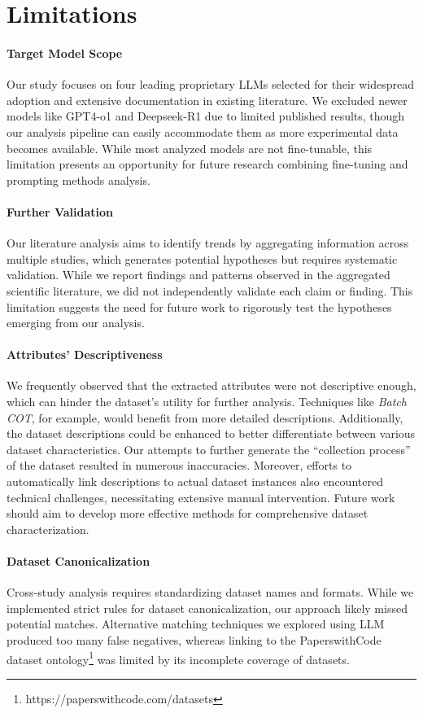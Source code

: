 \section{Limitations}
\label{sec:limitation}

\paragraph{Target Model Scope}
Our study focuses on four leading proprietary LLMs selected for their widespread adoption and extensive documentation in existing literature. 
We excluded newer models like GPT4-o1 and Deepseek-R1 due to limited published results, though our analysis pipeline can easily accommodate them as more experimental data becomes available. 
While most analyzed models are not fine-tunable, this limitation presents an opportunity for future research combining fine-tuning and prompting methods analysis.

\paragraph{Further Validation}

Our literature analysis aims to identify trends by aggregating information across multiple studies, which generates potential hypotheses but requires systematic validation. 
While we report findings and patterns observed in the aggregated scientific literature, we did not independently validate each claim or finding. 
This limitation suggests the need for future work to rigorously test the hypotheses emerging from our analysis.

\paragraph{Attributes' Descriptiveness}
We frequently observed that the extracted attributes were not descriptive enough, which can hinder the dataset's utility for further analysis. 
Techniques like \textit{Batch COT}, for example, would benefit from more detailed descriptions. 
Additionally, the dataset descriptions could be enhanced to better differentiate between various dataset characteristics. 
Our attempts to further generate the ``collection process'' of the dataset resulted in numerous inaccuracies. Moreover, efforts to automatically link descriptions to actual dataset instances also encountered technical challenges, necessitating extensive manual intervention. 
Future work should aim to develop more effective methods for comprehensive dataset characterization.

\paragraph{Dataset Canonicalization}
Cross-study analysis requires standardizing dataset names and formats. 
While we implemented strict rules for dataset canonicalization, our approach likely missed potential matches. 
Alternative matching techniques we explored using LLM produced too many false negatives, whereas linking to the PaperswithCode dataset ontology\footnote{https://paperswithcode.com/datasets} was limited by its incomplete coverage of datasets.
